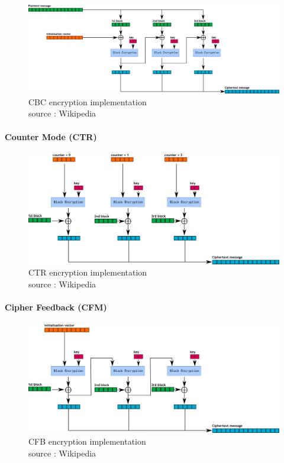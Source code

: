 \begin{figure}[h!]
    \centering
       \includegraphics[width=\textwidth]{images/CBC.png}
	\caption{CBC encryption implementation \\ source : Wikipedia}
	\label{fig:CBC_encryption_impl}
\end{figure}


\paragraph{ Counter Mode (CTR) }

\begin{figure}[h!]
    \centering
       \includegraphics[width=\textwidth]{images/CTR.png}
	\caption{CTR encryption implementation \\ source : Wikipedia}
	\label{fig:CTR_encryption_impl}
\end{figure}

\paragraph{ Cipher Feedback (CFM) }

\begin{figure}[h!]
    \centering
       \includegraphics[width=\textwidth]{images/CFB.png}
	\caption{CFB encryption implementation \\ source : Wikipedia}
	\label{fig:CFB_encryption_impl}
\end{figure}

